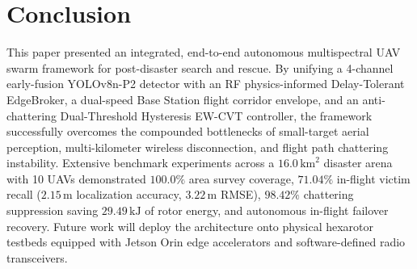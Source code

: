 \documentclass[conference]{IEEEtran}
\begin{document}
\section{Conclusion}
This paper presented an integrated, end-to-end autonomous multispectral UAV swarm framework for post-disaster search and rescue. By unifying a 4-channel early-fusion YOLOv8n-P2 detector with an RF physics-informed Delay-Tolerant EdgeBroker, a dual-speed Base Station flight corridor envelope, and an anti-chattering Dual-Threshold Hysteresis EW-CVT controller, the framework successfully overcomes the compounded bottlenecks of small-target aerial perception, multi-kilometer wireless disconnection, and flight path chattering instability. Extensive benchmark experiments across a $16.0\,\text{km}^2$ disaster arena with 10 UAVs demonstrated $100.0\%$ area survey coverage, $71.04\%$ in-flight victim recall ($2.15\,\text{m}$ localization accuracy, $3.22\,\text{m}$ RMSE), $98.42\%$ chattering suppression saving $29.49\,\text{kJ}$ of rotor energy, and autonomous in-flight failover recovery. Future work will deploy the architecture onto physical hexarotor testbeds equipped with Jetson Orin edge accelerators and software-defined radio transceivers.
\end{document}

